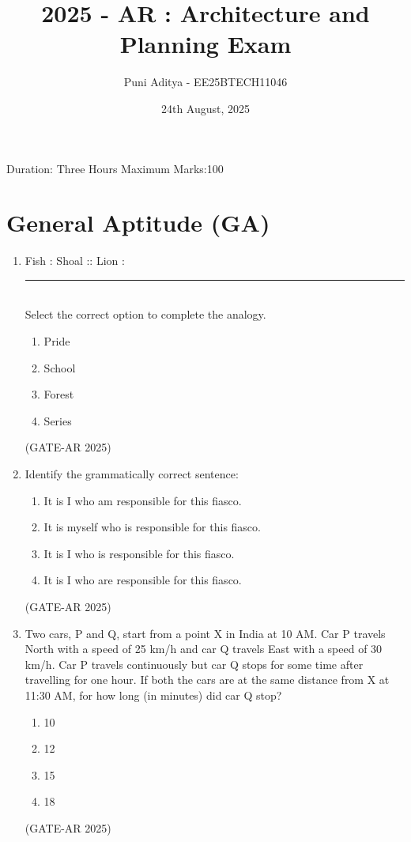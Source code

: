\documentclass[a4paper,10pt]{article}
\begin{document}
\title{2025 - AR : Architecture and Planning Exam}
\author{Puni Aditya - EE25BTECH11046}
\date{24th August, 2025}
\maketitle
Duration: Three Hours \hfill Maximum Marks:100

\section*{General Aptitude (GA)}

\begin{enumerate}
    \item Fish : Shoal :: Lion : \rule{2cm}{0.4pt} \\
    Select the correct option to complete the analogy.
    \begin{multicols}{4}
    \begin{enumerate}
        \item Pride
        \item School
        \item Forest
        \item Series
    \end{enumerate}
    \end{multicols}
    \hfill (GATE-AR 2025)

    \item Identify the grammatically correct sentence:
    \begin{enumerate}
        \item It is I who am responsible for this fiasco.
        \item It is myself who is responsible for this fiasco.
        \item It is I who is responsible for this fiasco.
        \item It is I who are responsible for this fiasco.
    \end{enumerate}
    \hfill (GATE-AR 2025)

    \item Two cars, P and Q, start from a point X in India at 10 AM. Car P travels North with a speed of 25 km/h and car Q travels East with a speed of 30 km/h. Car P travels continuously but car Q stops for some time after travelling for one hour. If both the cars are at the same distance from X at 11:30 AM, for how long (in minutes) did car Q stop?
    \begin{multicols}{4}
    \begin{enumerate}
        \item 10
        \item 12
        \item 15
        \item 18
    \end{enumerate}
    \end{multicols}
    \hfill (GATE-AR 2025)


\end{enumerate}
\end{document}

